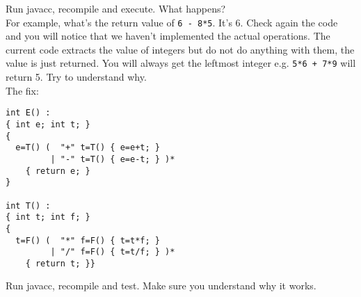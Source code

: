 \documentclass{article}
\begin{document}
Run javacc, recompile and execute. What happens? \\
For example, what's the return value of {\tt 6 - 8*5}. It's 6. Check again the code and you will notice that we haven't implemented the actual operations. The current code extracts the value of integers but do not do anything with them, the value is just returned. You will always get the leftmost integer e.g. {\tt 5*6 + 7*9} will return 5. Try to understand why. \\

\noindent The fix:

\begin{verbatim}
int E() :
{ int e; int t; }
{
  e=T() (  "+" t=T() { e=e+t; }
         | "-" t=T() { e=e-t; } )*
    { return e; }
}

int T() :
{ int t; int f; }
{
  t=F() (  "*" f=F() { t=t*f; }
         | "/" f=F() { t=t/f; } )*
    { return t; }}
\end{verbatim}

Run javacc, recompile and test. Make sure you understand why it works.
\end{document}
